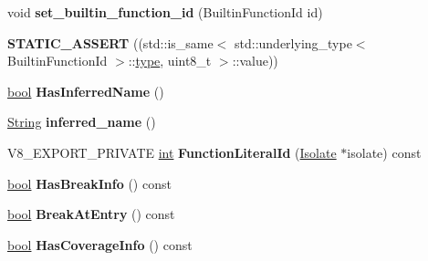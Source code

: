 \begin{DoxyCompactItemize}
\mbox{\label{classv8_1_1internal_1_1SharedFunctionInfo_a561a7cb8de50f03d19610d103eedc5e0}} 
void {\bfseries set\+\_\+builtin\+\_\+function\+\_\+id} (Builtin\+Function\+Id id)
\item 
\mbox{\label{classv8_1_1internal_1_1SharedFunctionInfo_a3417d39c7ee82be9284543a57b048a58}} 
{\bfseries S\+T\+A\+T\+I\+C\+\_\+\+A\+S\+S\+E\+RT} ((std\+::is\+\_\+same$<$ std\+::underlying\+\_\+type$<$ Builtin\+Function\+Id $>$\+::\mbox{\hyperlink{classstd_1_1conditional_1_1type}{type}}, uint8\+\_\+t $>$\+::value))
\item 
\mbox{\label{classv8_1_1internal_1_1SharedFunctionInfo_a0e6a45428e32f7722ae2a405f67c9cda}} 
\mbox{\hyperlink{classbool}{bool}} {\bfseries Has\+Inferred\+Name} ()
\item 
\mbox{\label{classv8_1_1internal_1_1SharedFunctionInfo_a23cee60a6d81026cab86e4521195029a}} 
\mbox{\hyperlink{classv8_1_1internal_1_1String}{String}} {\bfseries inferred\+\_\+name} ()
\item 
\mbox{\label{classv8_1_1internal_1_1SharedFunctionInfo_abbfb7d9c3304a4d04a8c52e4bf8fb0bd}} 
V8\+\_\+\+E\+X\+P\+O\+R\+T\+\_\+\+P\+R\+I\+V\+A\+TE \mbox{\hyperlink{classint}{int}} {\bfseries Function\+Literal\+Id} (\mbox{\hyperlink{classv8_1_1internal_1_1Isolate}{Isolate}} $\ast$isolate) const
\item 
\mbox{\label{classv8_1_1internal_1_1SharedFunctionInfo_aaf4d96a03fe3906284d8eded3d3259bb}} 
\mbox{\hyperlink{classbool}{bool}} {\bfseries Has\+Break\+Info} () const
\item 
\mbox{\label{classv8_1_1internal_1_1SharedFunctionInfo_af3081d458bf5d13cc2e118ca493ddb07}} 
\mbox{\hyperlink{classbool}{bool}} {\bfseries Break\+At\+Entry} () const
\item 
\mbox{\label{classv8_1_1internal_1_1SharedFunctionInfo_ae4cc28d3db5eb22668605e06d6aa1361}} 
\mbox{\hyperlink{classbool}{bool}} {\bfseries Has\+Coverage\+Info} () const

\end{DoxyCompactItemize}
